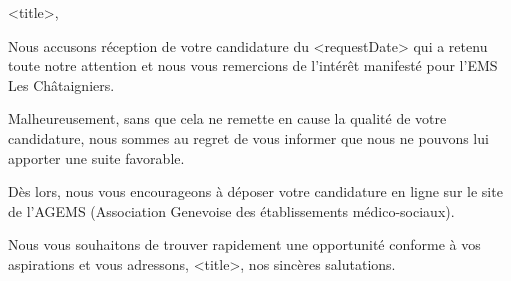 
<title>,

Nous accusons réception de votre candidature du <requestDate> qui a retenu toute notre attention et nous vous remercions de l’intérêt manifesté pour l’EMS Les Châtaigniers.

Malheureusement, sans que cela ne remette en cause la qualité de votre candidature, nous sommes au regret de vous informer que nous ne pouvons lui apporter une suite favorable.

Dès lors, nous vous encourageons à déposer votre candidature en ligne sur le site de l’AGEMS (Association Genevoise des établissements médico-sociaux).

Nous vous souhaitons de trouver rapidement une opportunité conforme à vos aspirations et vous adressons, <title>, nos sincères salutations.



